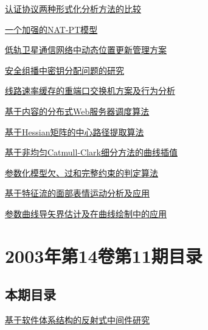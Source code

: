 \documentclass[a4paper]{article}
\begin{document}
\href{http://www.jos.org.cn/ch/reader/download_pdf.aspx?file_no=20031207&year_id=2003&quarter_id=12&falg=1}{认证协议两种形式化分析方法的比较}

\href{http://www.jos.org.cn/ch/reader/download_pdf.aspx?file_no=20031208&year_id=2003&quarter_id=12&falg=1}{一个加强的NAT-PT模型}

\href{http://www.jos.org.cn/ch/reader/download_pdf.aspx?file_no=20031209&year_id=2003&quarter_id=12&falg=1}{低轨卫星通信网络中动态位置更新管理方案}

\href{http://www.jos.org.cn/ch/reader/download_pdf.aspx?file_no=20031210&year_id=2003&quarter_id=12&falg=1}{安全组播中密钥分配问题的研究}

\href{http://www.jos.org.cn/ch/reader/download_pdf.aspx?file_no=20031211&year_id=2003&quarter_id=12&falg=1}{线路速率缓存的重端口交换机方案及行为分析}

\href{http://www.jos.org.cn/ch/reader/download_pdf.aspx?file_no=20031212&year_id=2003&quarter_id=12&falg=1}{基于内容的分布式Web服务器调度算法}

\href{http://www.jos.org.cn/ch/reader/download_pdf.aspx?file_no=20031213&year_id=2003&quarter_id=12&falg=1}{基于Hessian矩阵的中心路径提取算法}

\href{http://www.jos.org.cn/ch/reader/download_pdf.aspx?file_no=20031214&year_id=2003&quarter_id=12&falg=1}{基于非均匀Catmull-Clark细分方法的曲线插值}

\href{http://www.jos.org.cn/ch/reader/download_pdf.aspx?file_no=20031215&year_id=2003&quarter_id=12&falg=1}{参数化模型欠、过和完整约束的判定算法}

\href{http://www.jos.org.cn/ch/reader/download_pdf.aspx?file_no=20031216&year_id=2003&quarter_id=12&falg=1}{基于特征流的面部表情运动分析及应用}

\href{http://www.jos.org.cn/ch/reader/download_pdf.aspx?file_no=20031217&year_id=2003&quarter_id=12&falg=1}{参数曲线导矢界估计及在曲线绘制中的应用}


\section{\textbf{2003年第14卷第11期目录}}
\subsection{本期目录}
\href{http://www.jos.org.cn/ch/reader/download_pdf.aspx?file_no=20031101&year_id=2003&quarter_id=11&falg=1}{基于软件体系结构的反射式中间件研究}
\end{document}

